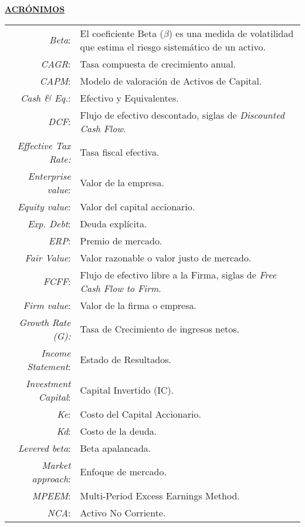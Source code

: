 \begin{center}
	\underline{\textbf{\textcolor{principal}{ACR\'ONIMOS}}}
\end{center}

\begin{table}[H]
 	\begin{tabular}{rp{10cm}}
\textit{Beta}:&	El coeficiente Beta ($\beta$) es una medida de volatilidad que estima el riesgo sistem\'atico de un activo.\\
\textit{CAGR}:&	Tasa compuesta de crecimiento anual.\\
\textit{CAPM}:&	Modelo de valoraci\'on de Activos de Capital.\\
\textit{Cash \& Eq.}:&	Efectivo y Equivalentes.\\
\textit{DCF}:&	Flujo de efectivo descontado, siglas de \textit{Discounted Cash Flow}.\\\textit{Effective Tax Rate:}&	Tasa fiscal efectiva.\\
\textit{Enterprise value}:&	Valor de la empresa.\\
\textit{Equity value}:&	Valor del capital accionario.\\
\textit{Exp. Debt}:& 	Deuda expl\'icita.\\
\textit{ERP}:	& Premio de mercado.\\
\textit{Fair Value}:&	Valor razonable o valor justo de mercado.\\
\textit{FCFF}:&	Flujo de efectivo libre a la Firma, siglas de \textit{Free Cash Flow to Firm}.\\
\textit{Firm value}:&	Valor de la firma o empresa.\\
\textit{Growth Rate (G):}&	Tasa de Crecimiento de ingresos netos.\\
\textit{Income Statement}:&	Estado de Resultados.\\
\textit{Investment Capital}:& 	Capital Invertido (IC).\\
\textit{Ke}:& 	Costo del Capital Accionario.\\
\textit{Kd}:& 	Costo de la deuda.\\
\textit{Levered beta}:& 	Beta apalancada.\\
\textit{Market approach}:& 	Enfoque de mercado.\\
\textit{MPEEM}:&	Multi-Period Excess Earnings Method.\\
\textit{NCA}:&	Activo No Corriente.\\

\end{tabular}
\end{table}
